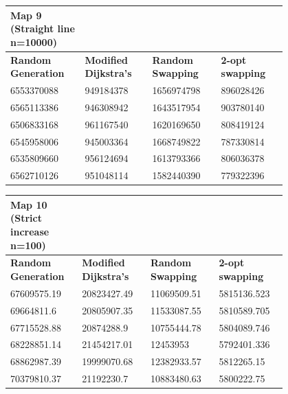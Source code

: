 \documentclass{article}
\begin{document}
\begin{table}[H]
    \centering
    \begin{tabular}{|p{0.2\linewidth}|p{0.2\linewidth}|p{0.2\linewidth}|p{0.2\linewidth}|}
    \hline
        \textbf{Map 9 (Straight line n=10000)} & ~ & ~ & ~ \\ \hline
        \textbf{Random Generation} & \textbf{Modified Dijkstra's} & \textbf{Random Swapping} & \textbf{2-opt swapping} \\ \hline
        6553370088 & 949184378 & 1656974798 & 896028426 \\ \hline
        6565113386 & 946308942 & 1643517954 & 903780140 \\ \hline
        6506833168 & 961167540 & 1620169650 & 808419124 \\ \hline
        6545958006 & 945003364 & 1668749822 & 787330814 \\ \hline
        6535809660 & 956124694 & 1613793366 & 806036378 \\ \hline
        6562710126 & 951048114 & 1582440390 & 779322396 \\ \hline
    \end{tabular}
\end{table}

\begin{table}[H]
    \centering
    \begin{tabular}{|p{0.2\linewidth}|p{0.2\linewidth}|p{0.2\linewidth}|p{0.2\linewidth}|}
    \hline
        \textbf{Map 10 (Strict increase n=100)} & ~ & ~ & ~ \\ \hline
        \textbf{Random Generation} & \textbf{Modified Dijkstra's} & \textbf{Random Swapping} & \textbf{2-opt swapping} \\ \hline
        67609575.19 & 20823427.49 & 11069509.51 & 5815136.523 \\ \hline
        69664811.6 & 20805907.35 & 11533087.55 & 5810589.705 \\ \hline
        67715528.88 & 20874288.9 & 10755444.78 & 5804089.746 \\ \hline
        68228851.14 & 21454217.01 & 12453953 & 5792401.336 \\ \hline
        68862987.39 & 19999070.68 & 12382933.57 & 5812265.15 \\ \hline
        70379810.37 & 21192230.7 & 10883480.63 & 5800222.75 \\ \hline
    \end{tabular}
\end{table}
\end{document}
